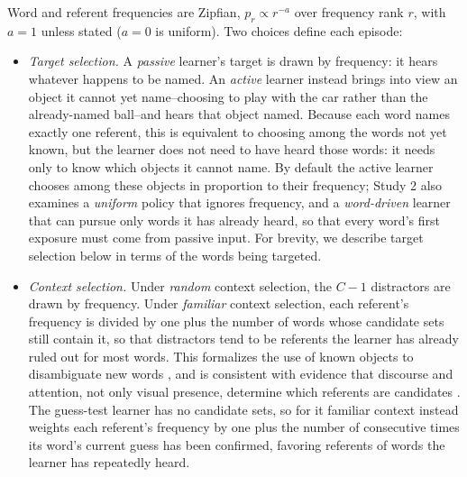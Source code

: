 \documentclass[a4paper,natbib,man]{apa6}
\begin{document}
Word and referent frequencies are Zipfian, $p_r \propto r^{-a}$ over frequency rank $r$, with $a=1$ unless stated ($a=0$ is uniform). Two choices define each episode:
\begin{itemize}
\item \textit{Target selection.} A \textit{passive} learner's target is drawn by frequency: it hears whatever happens to be named. An \textit{active} learner instead brings into view an object it cannot yet name--choosing to play with the car rather than the already-named ball--and hears that object named. Because each word names exactly one referent, this is equivalent to choosing among the words not yet known, but the learner does not need to have heard those words: it needs only to know which objects it cannot name. By default the active learner chooses among these objects in proportion to their frequency; Study 2 also examines a \textit{uniform} policy that ignores frequency, and a \textit{word-driven} learner that can pursue only words it has already heard, so that every word's first exposure must come from passive input. For brevity, we describe target selection below in terms of the words being targeted.
\item \textit{Context selection.} Under \textit{random} context selection, the $C-1$ distractors are drawn by frequency. Under \textit{familiar} context selection, each referent's frequency is divided by one plus the number of words whose candidate sets still contain it, so that distractors tend to be referents the learner has already ruled out for most words. This formalizes the use of known objects to disambiguate new words \citep{Grassmann:2015}, and is consistent with evidence that discourse and attention, not only visual presence, determine which referents are candidates \citep{FrankGoodmanTenenbaum:2009,FrankTenenbaumFernald:2013}. The guess-test learner has no candidate sets, so for it familiar context instead weights each referent's frequency by one plus the number of consecutive times its word's current guess has been confirmed, favoring referents of words the learner has repeatedly heard.
\end{itemize}
\end{document}
